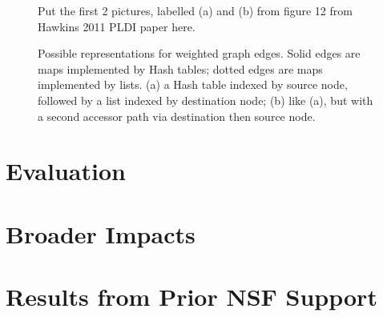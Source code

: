 \begin{figure}[t]
\centering
Put the first 2 pictures, labelled (a) and (b) from figure 12 from Hawkins 2011 PLDI paper here.
\caption{Possible representations for weighted graph edges.  Solid edges
are maps implemented by Hash tables; dotted edges are maps implemented
by lists.  (a) a Hash table 
indexed by source node, followed by a list indexed by destination node;
(b) like (a), but with a second accessor path via destination then
source node.}
\label{fig:rep-synth}
\end{figure}






\section{Evaluation}
\label{sec:eval}


\section{Broader Impacts}
\label{sec:impact}


\section{Results from Prior NSF Support}
\label{sec:prior-support}

